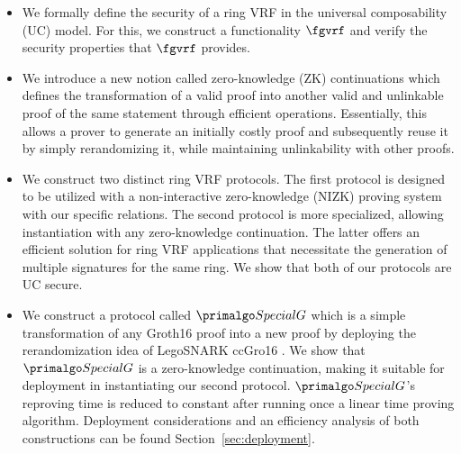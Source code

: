  \begin{itemize}
 	\item We formally define the security of a ring VRF in the universal composability (UC) model. For this, we construct a functionality $ \fgvrf $ and verify the security properties that $ \fgvrf $ provides.
 	
 	\item We introduce a new notion called zero-knowledge (ZK) continuations  which defines the transformation of a valid proof into another valid and unlinkable proof of the same statement through efficient operations. Essentially, this allows a prover to generate an initially costly proof and subsequently reuse it by simply rerandomizing it,  while maintaining unlinkability with other proofs. 
 	
 	\item We construct two distinct  ring VRF protocols. The first protocol is designed to be utilized with a non-interactive zero-knowledge (NIZK) proving system with our specific relations. The second protocol is more specialized, allowing instantiation with any zero-knowledge continuation. The latter offers an efficient solution for ring VRF applications that necessitate the generation of multiple signatures for the same ring. We show that both of our protocols are UC secure.
 	
 	\item 	We construct a protocol called $ \SpecialG $  which  is a simple transformation of any Groth16 proof into a new proof by deploying the rerandomization idea of LegoSNARK ccGro16 \cite{LegoSNARK}. We show that $ \SpecialG $ is a zero-knowledge continuation, making it suitable for deployment in instantiating our second protocol. $ \SpecialG $'s reproving time is reduced to constant after running once a linear time proving algorithm.  Deployment considerations and an efficiency analysis of both constructions can be found Section~\ref{sec:deployment}.
 	 
  
 \end{itemize}
